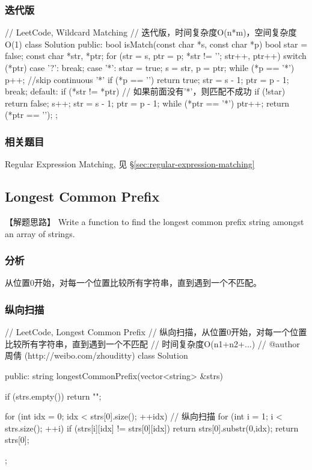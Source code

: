 \subsubsection{迭代版}
\begin{Code}
	// LeetCode, Wildcard Matching
	// 迭代版，时间复杂度O(n*m)，空间复杂度O(1)
	class Solution {
		public:
		bool isMatch(const char *s, const char *p) {
			bool star = false;
			const char *str, *ptr;
			for (str = s, ptr = p; *str != '\0'; str++, ptr++) {
				switch (*ptr) {
					case '?':
					break;
					case '*':
					star = true;
					s = str, p = ptr;
					while (*p == '*') p++;  //skip continuous '*'
					if (*p == '\0') return true;
					str = s - 1;
					ptr = p - 1;
					break;
					default:
					if (*str != *ptr) {
						// 如果前面没有'*'，则匹配不成功
						if (!star) return false;
						s++;
						str = s - 1;
						ptr = p - 1;
					}
				}
			}
			while (*ptr == '*') ptr++;
			return (*ptr == '\0');
		}
	};
\end{Code}


\subsubsection{相关题目}
\begindot
\item Regular Expression Matching, 见 \S \ref{sec:regular-expression-matching}
\myenddot


\subsection{Longest Common Prefix} %
\label{sec:longest-common-prefix}


【解题思路】
Write a function to find the longest common prefix string amongst an array of strings.


\subsubsection{分析}
从位置0开始，对每一个位置比较所有字符串，直到遇到一个不匹配。


\subsubsection{纵向扫描}
\begin{Code}
	// LeetCode, Longest Common Prefix
	// 纵向扫描，从位置0开始，对每一个位置比较所有字符串，直到遇到一个不匹配
	// 时间复杂度O(n1+n2+...)
	// @author 周倩 (http://weibo.com/zhouditty)
	class Solution {
		public:
		string longestCommonPrefix(vector<string> &strs) {
			if (strs.empty()) return "";
			
			for (int idx = 0; idx < strs[0].size(); ++idx) { // 纵向扫描
				for (int i = 1; i < strs.size(); ++i) {
					if (strs[i][idx] != strs[0][idx]) return strs[0].substr(0,idx);
				}
			}
			return strs[0];
		}
	};
\end{Code}


